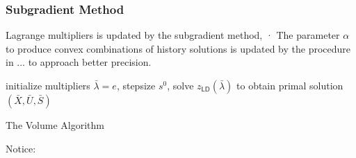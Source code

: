 \documentclass[
  a4paper,
,tablecaptionabove
]{scrartcl}
\numberwithin{equation}{section}
\begin{document}
\hypertarget{sec:subgradient-method}{%
  \subsubsection{Subgradient Method}\label{subgradient-method}}

Lagrange multipliers is updated by the subgradient method, ·
The parameter \(\alpha\) to produce convex combinations of history solutions is updated by the procedure in ... to approach better precision.


\begin{algorithm}[H]
  \SetAlgoLined
  initialize multipliers \(\bar \lambda = e\), stepsize \(s^0\), solve \(z_\mathsf{LD}(\bar \lambda) \)
  to obtain primal solution \((\bar X, \bar U, \bar S) \)  \;
  \caption{The Volume Algorithm}
\end{algorithm}

Notice:
\end{document}
